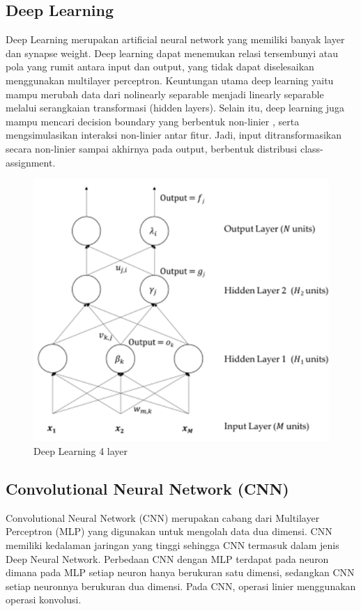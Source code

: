 \subsection{Deep Learning}
 Deep Learning merupakan artificial neural network yang memiliki banyak layer dan synapse weight. 
 Deep learning dapat menemukan relasi tersembunyi atau pola yang rumit antara input dan output, yang 
 tidak dapat diselesaikan menggunakan multilayer perceptron. Keuntungan  utama  deep  learning  yaitu 
 mampu merubah data dari nolinearly separable menjadi linearly separable melalui serangkaian transformasi 
 (hidden layers). Selain itu, deep learning juga mampu mencari decision boundary yang berbentuk non-linier
 , serta mengsimulasikan interaksi non-linier antar fitur. Jadi, input ditransformasikan secara 
 non-linier sampai akhirnya pada output, berbentuk distribusi class-assignment\citep{DeepLearning}.

 \begin{figure} [H] \centering
    \includegraphics[scale=0.6]{gambar/deeplearning.png}
    \caption{Deep Learning 4 layer}
    \label{fig:Deep Learning}
\end{figure}

\subsection{Convolutional Neural Network (CNN)}
Convolutional Neural Network (CNN) merupakan cabang dari Multilayer Perceptron (MLP) yang digunakan untuk
mengolah data dua dimensi. CNN memiliki kedalaman jaringan yang tinggi sehingga CNN termasuk dalam jenis
Deep Neural Network. Perbedaan CNN dengan MLP terdapat pada neuron dimana pada MLP setiap neuron hanya
berukuran satu dimensi, sedangkan CNN setiap neuronnya berukuran dua dimensi. Pada CNN, operasi linier
menggunakan operasi konvolusi\citep{CNN}.

